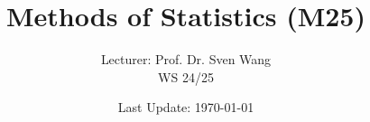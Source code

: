 
\titlehead
{\centering
\texttt{[image: /Users/monroestephenson/Downloads/Script/bilder/hu-logo.pdf]}
}


\subject{\sc Humboldt-Universität zu Berlin}
\title{Methods of Statistics (M25)}
\author{Lecturer: {Prof. Dr. Sven Wang}\\
WS 24/25}
\date{Last Update: \today}



\maketitle	%



